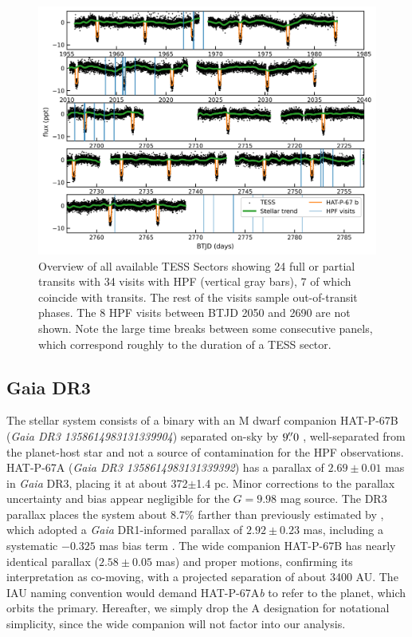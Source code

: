 \documentclass[twocolumn]{aastex631}
\begin{document}
\begin{figure}
    \centering
    \includegraphics[width=0.98\linewidth]{figures/TESS_HAT-P-67b_overview.png}
    \caption{Overview of all available TESS Sectors showing 24 full or partial transits with 34 visits with HPF (vertical gray bars), 7 of which coincide with transits.  The rest of the visits sample out-of-transit phases.  The 8 HPF visits between BTJD 2050 and 2690 are not shown.  Note the large time breaks between some consecutive panels, which correspond roughly to the duration of a TESS sector.}
    \label{fig:TESSoverview}
\end{figure}

\subsection{Gaia DR3}\label{gaiadr3}
The stellar system consists of a binary with an M dwarf companion HAT-P-67B (\emph{Gaia DR3 1358614983131339904}) separated on-sky by $9\mbox{$.\!\!^{\prime\prime}$}0$ \citep{2019MNRAS.490.5088M}, well-separated from the planet-host star and not a source of contamination for the HPF observations.  HAT-P-67A (\emph{Gaia DR3 1358614983131339392}) has a parallax of $2.69\pm0.01$ mas in \emph{Gaia} DR3, placing it at about 372$\pm$1.4 pc.  Minor corrections to the parallax uncertainty \citep{2021MNRAS.506.2269E} and bias \citep{2021A&A...649A...4L} appear negligible for the $G=9.98$ mag source.  The DR3 parallax places the system about 8.7\% farther than previously estimated by \citet{2017AJ....153..211Z}, which adopted a \emph{Gaia} DR1-informed parallax of $2.92\pm0.23$ mas, including a systematic $-0.325$ mas bias term \citep{2016ApJ...831L...6S}.  The wide companion HAT-P-67B has nearly identical parallax ($2.58\pm0.05$ mas) and proper motions, confirming its interpretation as co-moving, with a projected separation of about 3400 AU.  The IAU naming convention would demand HAT-P-67A\emph{b} to refer to the planet, which orbits the primary.  Hereafter, we simply drop the A designation for notational simplicity, since the wide companion will not factor into our analysis.
\end{document}
